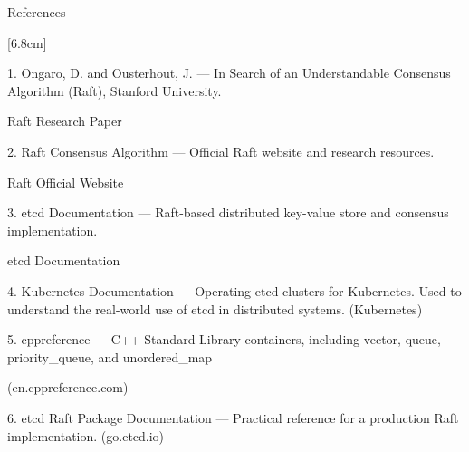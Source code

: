 \documentclass[11pt,a4paper]{article}
\newcommand{\blueheading}[1]{%
    {\sffamily\color{TitleBlue}\fontsize{15}{18}\selectfont #1}%
}
\newcommand{\instruction}[1]{%
    {\itshape\fontsize{10.5}{12.5}\selectfont #1}%
}
\newcommand{\answerbox}[2][3.0cm]{%
    \vspace{2pt}
    \noindent
    \fbox{%
        \begin{minipage}[t][#1][t]{\dimexpr\textwidth-2\fboxsep-2\fboxrule\relax}
            \vspace{1mm}
            \itshape #2
        \end{minipage}
    }
}
\begin{document}
\vspace{12mm}

\blueheading{References}

\vspace{1mm}

\instruction

\answerbox[6.8cm]{
\raggedright
1. Ongaro, D. and Ousterhout, J. — In Search of an Understandable Consensus Algorithm (Raft), Stanford University.

Raft Research Paper

2. Raft Consensus Algorithm — Official Raft website and research resources.

Raft Official Website

3. etcd Documentation — Raft-based distributed key-value store and consensus implementation.

etcd Documentation

4. Kubernetes Documentation — Operating etcd clusters for Kubernetes. Used to understand the real-world use of etcd in distributed systems. (Kubernetes)

5. cppreference — C++ Standard Library containers, including vector, queue, priority\_queue, and unordered\_map

(en.cppreference.com)

6. etcd Raft Package Documentation — Practical reference for a production Raft implementation. (go.etcd.io)
}
\end{document}
